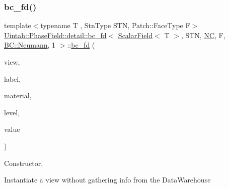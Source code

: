 \subsubsection{\texorpdfstring{bc\+\_\+fd()}{bc\_fd()}\hspace{0.1cm}{\footnotesize\ttfamily [2/3]}}
{\footnotesize\ttfamily template$<$typename T , Stn\+Type S\+TN, Patch\+::\+Face\+Type F$>$ \\
\hyperlink{classUintah_1_1PhaseField_1_1detail_1_1bc__fd}{Uintah\+::\+Phase\+Field\+::detail\+::bc\+\_\+fd}$<$ \hyperlink{structUintah_1_1PhaseField_1_1ScalarField}{Scalar\+Field}$<$ T $>$, S\+TN, \hyperlink{namespaceUintah_1_1PhaseField_a33d355affda78a83f45755ba8388cedda77924170fe82bfd58b74ca3e44139718}{NC}, F, \hyperlink{namespaceUintah_1_1PhaseField_a148fba372aa3be96fd6eede7a2fa10b5ab8537a769dbc90cb1762215441212152}{B\+C\+::\+Neumann}, 1 $>$\+::\hyperlink{classUintah_1_1PhaseField_1_1detail_1_1bc__fd}{bc\+\_\+fd} (\begin{DoxyParamCaption}\item[{const \hyperlink{classUintah_1_1PhaseField_1_1detail_1_1view}{view}$<$ \hyperlink{structUintah_1_1PhaseField_1_1ScalarField}{Field} $>$ $\ast$}]{view,  }\item[{const Var\+Label $\ast$}]{label,  }\item[{int}]{material,  }\item[{const Level $\ast$}]{level,  }\item[{const V \&}]{value }\end{DoxyParamCaption})\hspace{0.3cm}{\ttfamily [inline]}}



Constructor. 

Instantiate a view without gathering info from the Data\+Warehouse


